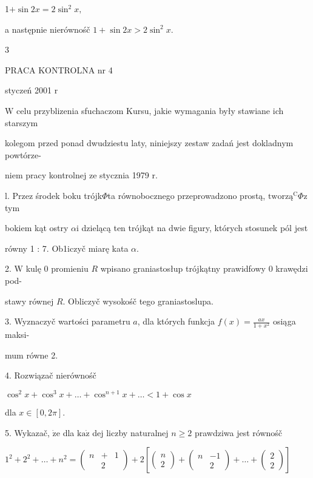 \documentclass[a4paper,12pt]{article}
\begin{document}
1$+ \sin 2x=2\sin^{2}x,$

a następnie nierównośč $1+\sin 2x>2\sin^{2}x.$

3





PRACA KONTROLNA nr 4

styczeń 2001 $\mathrm{r}$

$\mathrm{W}$ celu przyblizenia sfuchaczom Kursu, jakie wymagania były stawiane ich starszym

kolegom przed ponad dwudziestu laty, niniejszy zestaw zadań jest dokladnym powtórze-

niem pracy kontrolnej ze stycznia 1979 $\mathrm{r}.$

l. Przez środek boku trójk$\Phi$ta równobocznego przeprowadzono prostą, $\mathrm{t}\mathrm{w}\mathrm{o}\mathrm{r}\mathrm{z}\text{ą}^{\mathrm{C}}\Phi \mathrm{z}$ tym

bokiem kąt ostry $\alpha \mathrm{i}$ dzielącą ten trójkąt na dwie figury, których stosunek pól jest

równy 1 : 7. Ob1iczyč miarę kata $\alpha.$

2. $\mathrm{W}$ kulę $0$ promieniu $R$ wpisano graniastosłup trójkątny prawidfowy $0$ krawędzi pod-

stawy równej $R$. Obliczyč wysokośč tego graniastoslupa.

3. Wyznaczyč wartości parametru $a$, dla których funkcja $f(x) = \displaystyle \frac{ax}{1+x^{2}}$ osiąga maksi-

mum równe 2.

4. Rozwiązač nierównośč

$\cos^{2}x+\cos^{3}x+\ldots+\cos^{n+1}x+\ldots<1+\cos x$

dla $x\in[0,2\pi].$

5. Wykazač, $\dot{\mathrm{z}}\mathrm{e}$ dla $\mathrm{k}\mathrm{a}\dot{\mathrm{z}}$ dej liczby naturalnej $n\geq 2$ prawdziwa jest równośč

$1^{2}+2^{2}+\ldots+n^{2}= \left(\begin{array}{lll}
n & + & 1\\
 & 2 & 
\end{array}\right)+2[\left(\begin{array}{l}
n\\
2
\end{array}\right)+\left(\begin{array}{ll}
n & -1\\
 & 2
\end{array}\right)+\ldots+ \left(\begin{array}{l}
2\\
2
\end{array}\right)]$
\end{document}
